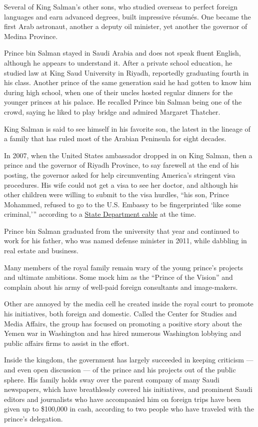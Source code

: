 Several of King Salman's other sons, who studied overseas to perfect
foreign languages and earn advanced degrees, built impressive résumés.
One became the first Arab astronaut, another a deputy oil minister, yet
another the governor of Medina Province.

Prince bin Salman stayed in Saudi Arabia and does not speak fluent
English, although he appears to understand it. After a private school
education, he studied law at King Saud University in Riyadh, reportedly
graduating fourth in his class. Another prince of the same generation
said he had gotten to know him during high school, when one of their
uncles hosted regular dinners for the younger princes at his palace. He
recalled Prince bin Salman being one of the crowd, saying he liked to
play bridge and admired Margaret Thatcher.

King Salman is said to see himself in his favorite son, the latest in
the lineage of a family that has ruled most of the Arabian Peninsula for
eight decades.

In 2007, when the United States ambassador dropped in on King Salman,
then a prince and the governor of Riyadh Province, to say farewell at
the end of his posting, the governor asked for help circumventing
America's stringent visa procedures. His wife could not get a visa to
see her doctor, and although his other children were willing to submit
to the visa hurdles, ``his son, Prince Mohammed, refused to go to the
U.S. Embassy to be fingerprinted `like some criminal,''' according to a
\href{https://wikileaks.org/plusd/cables/07RIYADH651_a.html}{State
Department cable} at the time.

Prince bin Salman graduated from the university that year and continued
to work for his father, who was named defense minister in 2011, while
dabbling in real estate and business.

Many members of the royal family remain wary of the young prince's
projects and ultimate ambitions. Some mock him as the ``Prince of the
Vision'' and complain about his army of well-paid foreign consultants
and image-makers.

Other are annoyed by the media cell he created inside the royal court to
promote his initiatives, both foreign and domestic. Called the Center
for Studies and Media Affairs, the group has focused on promoting a
positive story about the Yemen war in Washington and has hired numerous
Washington lobbying and public affairs firms to assist in the effort.

Inside the kingdom, the government has largely succeeded in keeping
criticism --- and even open discussion --- of the prince and his
projects out of the public sphere. His family holds sway over the parent
company of many Saudi newspapers, which have breathlessly covered his
initiatives, and prominent Saudi editors and journalists who have
accompanied him on foreign trips have been given up to \$100,000 in
cash, according to two people who have traveled with the prince's
delegation.

